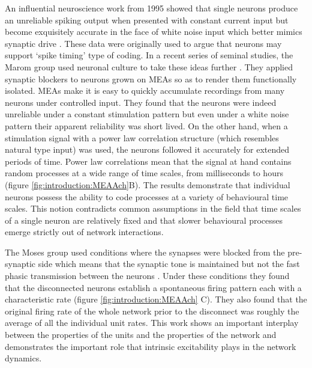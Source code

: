     An influential neuroscience work from 1995 showed that single neurons produce an unreliable spiking output when presented with constant current input but become exquisitely accurate in the face of white noise input which better mimics synaptic drive \cite{mainen1995reliability}. These data were originally used to argue that neurons may support `spike timing' type of coding. In a recent series of seminal studies, the Marom group used neuronal culture to take these ideas further \cite{gal2013entrainment,gal2010dynamics,reinartz2014synaptic}. They applied synaptic blockers to neurons grown on MEAs so as to render them functionally isolated. MEAs make it is easy to quickly accumulate recordings from many neurons under controlled input. They found that the neurons were indeed unreliable under a constant stimulation pattern but even under a white noise pattern their apparent reliability was short lived. On the other hand, when a stimulation signal with a power law correlation structure (which resembles natural type input) was used, the neurons followed it accurately for extended periods of time. Power law correlations mean that the signal at hand contains random processes at a wide range of time scales, from milliseconds to hours (figure \ref{fig:introduction:MEAAch}B). The results demonstrate that individual neurons possess the ability to code processes at a variety of behavioural time scales. This notion contradicts common assumptions in the field that time scales of a single neuron are relatively fixed and that slower behavioural processes emerge strictly out of network interactions.

    The Moses group used conditions where the synapses were blocked from the pre-synaptic side which means that the synaptic tone is maintained but not the fast phasic transmission between the neurons \cite{penn2016network}. Under these conditions they found that the disconnected neurons establish a spontaneous firing pattern each with a characteristic rate (figure \ref{fig:introduction:MEAAch} C). They also found that the original firing rate of the whole network prior to the disconnect was roughly the average of all the individual unit rates. This work shows an important interplay between the properties of the units and the properties of the network and demonstrates the important role that intrinsic excitability plays in the network dynamics.

